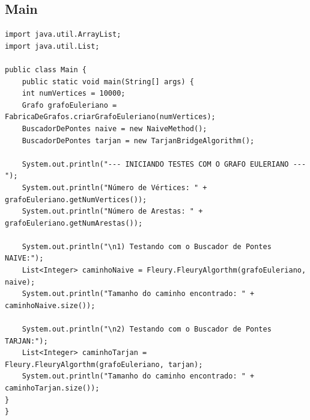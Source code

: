 \documentclass[12pt]{article}
\begin{document}
\subsection{Main}
\begin{lstlisting}
import java.util.ArrayList;
import java.util.List;

public class Main {
    public static void main(String[] args) {
    int numVertices = 10000;
    Grafo grafoEuleriano = FabricaDeGrafos.criarGrafoEuleriano(numVertices);
    BuscadorDePontes naive = new NaiveMethod();
    BuscadorDePontes tarjan = new TarjanBridgeAlgorithm();
    
    System.out.println("--- INICIANDO TESTES COM O GRAFO EULERIANO ---");
    System.out.println("Número de Vértices: " + grafoEuleriano.getNumVertices());
    System.out.println("Número de Arestas: " + grafoEuleriano.getNumArestas());

    System.out.println("\n1) Testando com o Buscador de Pontes NAIVE:");
    List<Integer> caminhoNaive = Fleury.FleuryAlgorthm(grafoEuleriano, naive);
    System.out.println("Tamanho do caminho encontrado: " + caminhoNaive.size());

    System.out.println("\n2) Testando com o Buscador de Pontes TARJAN:");
    List<Integer> caminhoTarjan = Fleury.FleuryAlgorthm(grafoEuleriano, tarjan);
    System.out.println("Tamanho do caminho encontrado: " + caminhoTarjan.size());
}
}
\end{lstlisting}
\end{document}
